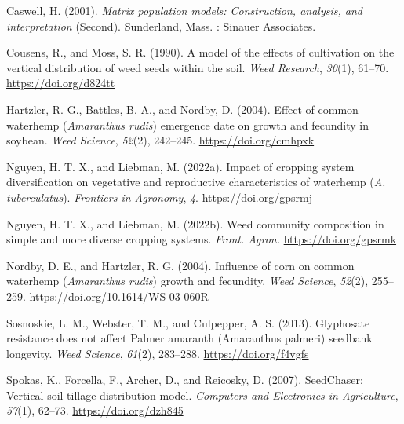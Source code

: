 \documentclass[
]{article}
\newlength{\cslhangindent}
\newlength{\cslentryspacingunit} %
\newenvironment{CSLReferences}[2] %
 {%
  \setlength{\parindent}{0pt}
  \ifodd #1
  \let\oldpar\par
  \def\par{\hangindent=\cslhangindent\oldpar}
  \fi
  \setlength{\parskip}{#2\cslentryspacingunit}
 }%
 {}
\begin{document}
\hypertarget{refs}{}
\begin{CSLReferences}{1}{0}
\leavevmode{}%
Caswell, H. (2001). \emph{Matrix population models: Construction, analysis, and interpretation} (Second). {Sunderland, Mass. : Sinauer Associates}.

\leavevmode{}%
Cousens, R., and Moss, S. R. (1990). A model of the effects of cultivation on the vertical distribution of weed seeds within the soil. \emph{Weed Research}, \emph{30}(1), 61--70. \url{https://doi.org/d824tt}

\leavevmode{}%
Hartzler, R. G., Battles, B. A., and Nordby, D. (2004). Effect of common waterhemp ({\emph{Amaranthus rudis}}) emergence date on growth and fecundity in soybean. \emph{Weed Science}, \emph{52}(2), 242--245. \url{https://doi.org/cmhpxk}

\leavevmode{}%
Nguyen, H. T. X., and Liebman, M. (2022a). Impact of cropping system diversification on vegetative and reproductive characteristics of waterhemp ({\emph{A. tuberculatus}}). \emph{Frontiers in Agronomy}, \emph{4}. \url{https://doi.org/gpsrmj}

\leavevmode{}%
Nguyen, H. T. X., and Liebman, M. (2022b). Weed community composition in simple and more diverse cropping systems. \emph{Front. Agron.} \url{https://doi.org/gpsrmk}

\leavevmode{}%
Nordby, D. E., and Hartzler, R. G. (2004). Influence of corn on common waterhemp ({\emph{Amaranthus rudis}}) growth and fecundity. \emph{Weed Science}, \emph{52}(2), 255--259. \url{https://doi.org/10.1614/WS-03-060R}

\leavevmode{}%
Sosnoskie, L. M., Webster, T. M., and Culpepper, A. S. (2013). Glyphosate resistance does not affect {Palmer} amaranth ({Amaranthus} palmeri) seedbank longevity. \emph{Weed Science}, \emph{61}(2), 283--288. \url{https://doi.org/f4vgfs}

\leavevmode{}%
Spokas, K., Forcella, F., Archer, D., and Reicosky, D. (2007). {SeedChaser}: {Vertical} soil tillage distribution model. \emph{Computers and Electronics in Agriculture}, \emph{57}(1), 62--73. \url{https://doi.org/dzh845}

\end{CSLReferences}
\end{document}
